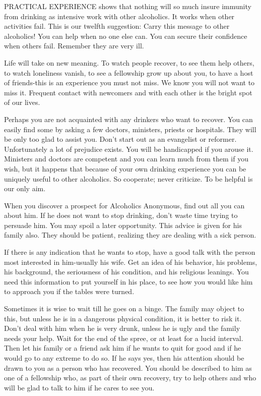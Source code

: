 
\bbChapterPreamble


\begin{biblechapter}
    PRACTICAL EXPERIENCE shows that nothing will so much insure immunity from drinking as intensive work with other alcoholics.  It works when other activities fail.  This is our twelfth suggestion: Carry this message to other alcoholics!  You can help when no one else can.  You can secure their confidence when others fail.  Remember they are very ill.

Life will take on new meaning.  To watch people recover, to see them help others, to watch loneliness vanish, to see a fellowship grow up about you, to have a host of friends-this is an experience you must not miss.  We know you will not want to miss it.  Frequent contact with newcomers and with each other is the bright spot of our lives.

Perhaps you are not acquainted with any drinkers who want to recover.  You can easily find some by asking a few doctors, ministers, priests or hospitals.  They will be only too glad to assist you.  Don't start out as an evangelist or reformer.  Unfortunately a lot of prejudice exists.  You will be handicapped if you arouse it.  Ministers and doctors are competent and you can learn much from them if you wish, but it happens that because of your own drinking experience you can be uniquely useful to other alcoholics.  So cooperate; never criticize.  To be helpful is our only aim.

When you discover a prospect for Alcoholics Anonymous, find out all you can about him.  If he does not want to stop drinking, don't waste time trying to persuade him.  You may spoil a later opportunity.  This advice is given for his family also.  They should be patient, realizing they are dealing with a sick person.

If there is any indication that he wants to stop,  have a good talk with the person most interested in him-usually his wife.  Get an idea of his behavior, his problems, his background, the seriousness of his condition, and his religious leanings.  You need this information to put yourself in his place, to see how you would like him to approach you if the tables were turned.

Sometimes it is wise to wait till he goes on a binge.  The family may object to this, but unless he is in a dangerous physical condition, it is better to risk it.  Don't deal with him when he is very drunk, unless he is ugly and the family needs your help.  Wait for the end of the spree, or at least for a lucid interval.  Then let his family or a friend ask him if he wants to quit for good and if he would go to any extreme to do so.  If he says yes, then his attention should be drawn to you as a person who has recovered.  You should be described to him as one of a fellowship who, as part of their own recovery, try to help others and who will be glad to talk to him if he cares to see you.


\end{biblechapter}
